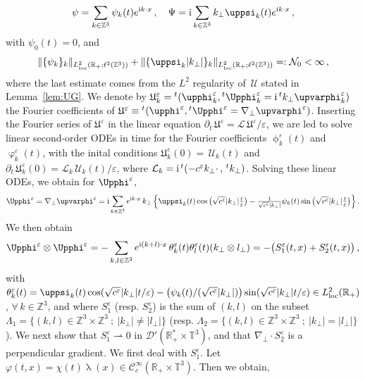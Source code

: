 \documentclass[11pt,reqno]{amsart}
\def \R{{\mathbb{R}}}
\def \Z{{\mathbb{Z}}}
\def \T{{\mathbb{T}}}
\begin{document}
  \[
  \psi=\sum_{k\in\Z^3} \psi_k(t) e^{{\rm i}k\cdot x}\,, \quad  \Psi={\rm i}\sum_{k\in\Z^3} k_\perp\uppsi_k(t) e^{{\rm i}k\cdot x}\,, 
  \]
  with $\psi_0(t)=0$, and
  \begin{equation}
    \label{eqn:N0}
    \| \{ \psi_k\}_k \|_{L_{\rm loc}^2(\R_+; \ell^2(\Z^3))} + \| \{\uppsi_k |k_\perp|\}_k \|_{L_{\rm loc}^2(\R_+; \ell^2(\Z^3))} =:\mathcal N_0 <\infty\,,
  \end{equation} 
  where the last estimate comes from the $L^2$ regularity of $\, \mathcal U$ stated in Lemma~\ref{lem:UG}.  We  denote by $\mathfrak U_k^\varepsilon={}^t(\upphi_k^\varepsilon, {}^t \Upphi_k^\varepsilon = {\rm i}\,{}^t  k_\perp\upvarphi_k^\varepsilon)$ the Fourier coefficients of $\mathfrak U^\varepsilon \equiv {}^t(\upphi^\varepsilon, {}^t \Upphi^\varepsilon=\nabla_\perp \upvarphi^\varepsilon)$. Inserting  the Fourier series  of $\mathfrak U^\varepsilon $ in the linear equation $\partial_t\,\mathfrak U^\varepsilon = \mathcal L\, \mathfrak U^\varepsilon/\varepsilon $, we are  led to solve linear second-order ODEs in time for the Fourier coefficients $\upphi_k^\varepsilon(t)$ and  $\upvarphi_k^\varepsilon(t)$, with the inital conditions $\mathfrak U_k ^\varepsilon(0)= \, \mathcal U_k(t)$  and  $\partial_t\,\mathfrak U_k^\varepsilon(0)= \mathcal L_k \,\mathcal U_k(t)/\varepsilon $, where $\mathcal L_k = {\rm i}\, {}^t(-c^\varepsilon  k_\perp \cdot\, ,\, {}^t k_\perp)$. Solving these linear ODEs, we obtain for $\Upphi^\varepsilon$,
  \begin{equation*}
    \label{Upphieps}
    \Upphi^\varepsilon= \nabla_\perp \upvarphi^\varepsilon = {\rm i}
    \sum_{k\in\Z^3} e^{{\rm i}k\cdot x} \, k_\perp \, \Big \{
    \uppsi_k(t) \cos\big(\sqrt{c^\varepsilon}|k_\perp|\tfrac t \varepsilon\big) -
    \tfrac{1}{\sqrt{c^\varepsilon}|k_\perp|} \psi_k(t)\sin\big(\sqrt{c^\varepsilon}|k_\perp|\tfrac t \varepsilon\big)
    \Big \}\,.
  \end{equation*}  
  We then obtain
  \begin{equation}
    \label{eqn:upup}
  \Upphi^\varepsilon\otimes \Upphi^\varepsilon
  = -\sum_{k,l \in \Z^3} e^{{\rm i}(k+l)\cdot x} \, \theta_k^\varepsilon(t)  \theta_l^\varepsilon(t) ( k_\perp \otimes l_\perp)  = -\big(S_1^\varepsilon(t,x) + S_2^\varepsilon(t,x)\big)\,, 
  \end{equation}
  with $\theta_k^\varepsilon(t)=\uppsi_k(t) \cos(\sqrt{c^\varepsilon}|k_\perp| t /\varepsilon) - \bigl( {\psi_k(t)}/({\sqrt{c^\varepsilon}|k_\perp|}) \bigr) \sin (\sqrt{c^\varepsilon}|k_\perp| t /\varepsilon) \in L_{\rm loc}^2(\R_+)$, $\forall \, k\in \Z^3$, and where $S_1^\varepsilon$ (resp. $S_2^\varepsilon$) is the sum of $(k,l)$ on the subset $\Lambda_1=\{(k,l)\in \Z^3\times \Z^3 \ ; \ |k_\perp| \neq |l_\perp|\}$ (resp.  $\Lambda_2=\{(k,l) \in \Z^3\times \Z^3 \ ; \ |k_\perp| = |l_\perp|\}$). We next show that $S_1^\varepsilon \rightharpoonup 0$ in $\mathcal D'(\R_+^* \times \T^3)$, and that $\nabla_\perp \cdot S_2^\varepsilon $ is a perpendicular gradient. We first deal with  $S_1^\varepsilon$. Let $\varphi(t,x) = \chi(t) \uplambda(x) \in \mathscr{C}_c^\infty(\R_+\times\T^3)$. Then we obtain,
\end{document}
